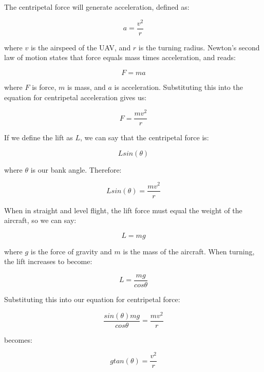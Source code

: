 The centripetal force will generate acceleration, defined as:

\begin{equation}
	a = \frac{v^2}{r}	
\end{equation}

where $v$ is the airspeed of the UAV, and $r$ is the turning radius. Newton's second law of motion states that force equals mass times acceleration, and reads:

\begin{equation}
	F = ma
\end{equation}

where $F$ is force, $m$ is mass, and $a$ is acceleration. Substituting this into the equation for centripetal acceleration gives us:

\begin{equation}
	F = \frac{mv^2}{r}	
\end{equation}

 If we define the lift as $L$, we can say that the centripetal force is:

\begin{equation}
	Lsin(\theta)
\end{equation}

where $\theta$ is our bank angle. Therefore:

\begin{equation}
	Lsin(\theta) = \frac{mv^2}{r}
\end{equation}

When in straight and level flight, the lift force must equal the weight of the aircraft, so we can say:

\begin{equation}
	L = mg
\end{equation}

where $g$ is the force of gravity and $m$ is the mass of the aircraft. When turning, the lift increases to become:

\begin{equation}
	L = \frac{mg}{cos\theta}
\end{equation}

Substituting this into our equation for centripetal force:

\begin{equation}
	\frac{sin(\theta)mg}{cos\theta} = \frac{mv^2}{r}
\end{equation}
 
 becomes:

\begin{equation}
	gtan(\theta) = \frac{v^2}{r}
\end{equation}

